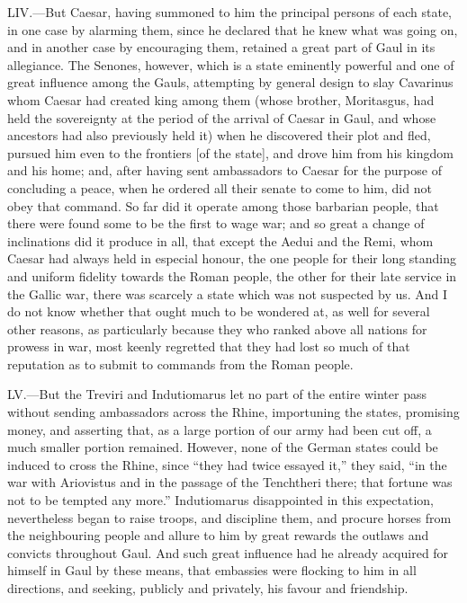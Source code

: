 LIV.—But Caesar, having summoned to him the principal persons of each
state, in one case by alarming them, since he declared that he knew what
was going on, and in another case by encouraging them, retained a great
part of Gaul in its allegiance. The Senones, however, which is a state
eminently powerful and one of great influence among the Gauls,
attempting by general design to slay Cavarinus whom Caesar had created
king among them (whose brother, Moritasgus, had held the sovereignty at
the period of the arrival of Caesar in Gaul, and whose ancestors had
also previously held it) when he discovered their plot and fled, pursued
him even to the frontiers [of the state], and drove him from his kingdom
and his home; and, after having sent ambassadors to Caesar for the
purpose of concluding a peace, when he ordered all their senate to come
to him, did not obey that command. So far did it operate among those
barbarian people, that there were found some to be the first to wage
war; and so great a change of inclinations did it produce in all, that
except the Aedui and the Remi, whom Caesar had always held in especial
honour, the one people for their long standing and uniform fidelity
towards the Roman people, the other for their late service in the Gallic
war, there was scarcely a state which was not suspected by us. And I do
not know whether that ought much to be wondered at, as well for several
other reasons, as particularly because they who ranked above all nations
for prowess in war, most keenly regretted that they had lost so much of
that reputation as to submit to commands from the Roman people.

LV.—But the Treviri and Indutiomarus let no part of the entire winter
pass without sending ambassadors across the Rhine, importuning the
states, promising money, and asserting that, as a large portion of our
army had been cut off, a much smaller portion remained. However, none of
the German states could be induced to cross the Rhine, since ``they had
twice essayed it,'' they said, ``in the war with Ariovistus and in the
passage of the Tenchtheri there; that fortune was not to be tempted any
more.'' Indutiomarus disappointed in this expectation, nevertheless began
to raise troops, and discipline them, and procure horses from the
neighbouring people and allure to him by great rewards the outlaws and
convicts throughout Gaul. And such great influence had he already
acquired for himself in Gaul by these means, that embassies were
flocking to him in all directions, and seeking, publicly and privately,
his favour and friendship.

